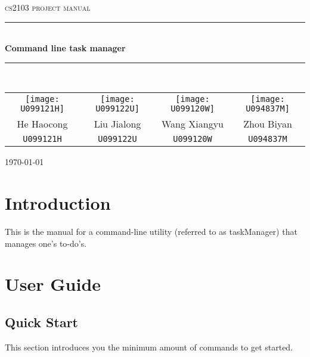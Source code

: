 \documentclass[12pt, a4paper]{article}
\begin{document}
\begin{titlepage}
  \centering

  \textsc{\LARGE cs2103 project manual}
  \\[1.5cm]
  \hrule
  \\[0.5cm]
  \Large \bfseries Command line task manager
  \\[0.4cm]
  \hrule
  \\[1.5cm]

  \begin{tabular}{c | c | c | c}
    \texttt{[image: U099121H]}&
    \texttt{[image: U099122U]}&
    \texttt{[image: U099120W]}&
    \texttt{[image: U094837M]}\\

    \small{He Haocong} & \small{Liu Jialong} & \small{Wang Xiangyu} & \small{Zhou Biyan}\\
    \small{\texttt{U099121H}} & \small{\texttt{U099122U}} & \small{\texttt{U099120W}} & \small{\texttt{U094837M}}\\
  \end{tabular}

  \vfill
  {\large \today}
\end{titlepage}

\tableofcontents
\newpage

\section{Introduction}
This is the manual for a command-line utility (referred to as taskManager) that manages one's to-do's.

\section{User Guide}
\subsection{Quick Start}

This section introduces you the minimum amount of commands to get started.
\end{document}
